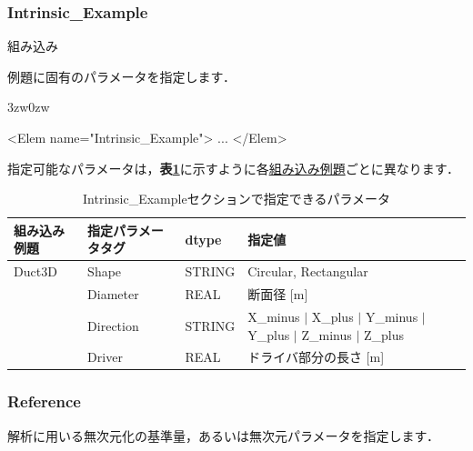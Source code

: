 \pagebreak
\subsubsection{Intrinsic\_Example}

\hypertarget{tgt:intrinsic_example}{組み込み}例題に固有のパラメータを指定します．

\begin{indentation}{3zw}{0zw}
\small

\begin{program}
<Elem name="Intrinsic_Example">
  ...
</Elem>
\end{program}

\normalsize
指定可能なパラメータは，\textbf{表\ref{tbl:intrinsic_parameter}}に示すように各\hyperlink{tgt:example}{組み込み例題}ごとに異なります．

\begin{table}[htdp]
\caption{Intrinsic\_Exampleセクションで指定できるパラメータ}
\begin{center}
\small
\begin{tabular}{llll} \toprule
組み込み例題 & 指定パラメータタグ & dtype & 指定値\\ \midrule
Duct3D & Shape     & STRING & Circular, Rectangular\\
       & Diameter  & REAL   & 断面径 [m]\\
       & Direction & STRING & X\_minus $|$ X\_plus $|$ Y\_minus $|$ Y\_plus $|$ Z\_minus $|$ Z\_plus\\
       & Driver    & REAL   & ドライバ部分の長さ [m]\\ \bottomrule
\end{tabular}
\end{center}
\label{tbl:intrinsic_parameter}
\end{table}

\end{indentation}



\pagebreak
\subsubsection{Reference}

解析に用いる無次元化の\hypertarget{tgt:reference}{基準量}，あるいは無次元パラメータを指定します．

